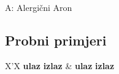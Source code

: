 \begin{statement}[
  timelimit=1 s,
  memorylimit=512 MiB,
]{A: Alergični Aron}
\subsection*{Probni primjeri}
\begin{tabularx}{\textwidth}{X'X}
  \textbf{ulaz}
  \linespread{1}{}
  \textbf{izlaz}
  \linespread{1}{} &
  \textbf{ulaz}
  \linespread{1}{}
  \textbf{izlaz}
  \linespread{1}{}
\end{tabularx}

\end{statement}

